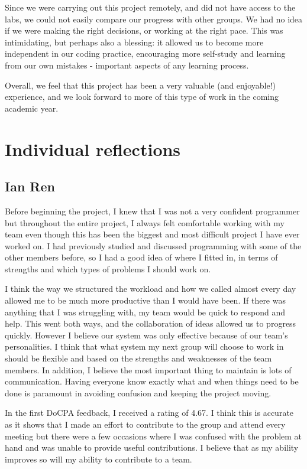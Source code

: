 \documentclass[11pt]{article}
\begin{document}
Since we were carrying out this project remotely, and did not have access to the labs, we could not easily compare our progress with other groups. We had no idea if we were making the right decisions, or working at the right pace. This was intimidating, but perhaps also a blessing: it allowed us to become more independent in our coding practice, encouraging more self-study and learning from our own mistakes - important aspects of any learning process.

Overall, we feel that this project has been a very valuable (and enjoyable!) experience, and we look forward to more of this type of work in the coming academic year.

\section*{Individual reflections}

\subsection*{Ian Ren}
Before beginning the project, I knew that I was not a very confident programmer but throughout the entire project, I always felt comfortable working with my team even though this has been the biggest and most difficult project I have ever worked on. I had previously studied and discussed programming with some of the other members before, so I had a good idea of where I fitted in, in terms of strengths and which types of problems I should work on.

I think the way we structured the workload and how we called almost every day allowed me to be much more productive than I would have been. If there was anything that I was struggling with, my team would be quick to respond and help. This went both ways, and the collaboration of ideas allowed us to progress quickly. However I believe our system was only effective because of our team’s personalities. I think that what system my next group will choose to work in should be flexible and based on the strengths and weaknesses of the team members. In addition, I believe the most important thing to maintain is lots of communication. Having everyone know exactly what and when things need to be done is paramount in avoiding confusion and keeping the project moving.

In the first DoCPA feedback, I received a rating of 4.67. I think this is accurate as it shows that I made an effort to contribute to the group and attend every meeting but there were a few occasions where I was confused with the problem at hand and was unable to provide useful contributions. I believe that as my ability improves so will my ability to contribute to a team.
\end{document}
